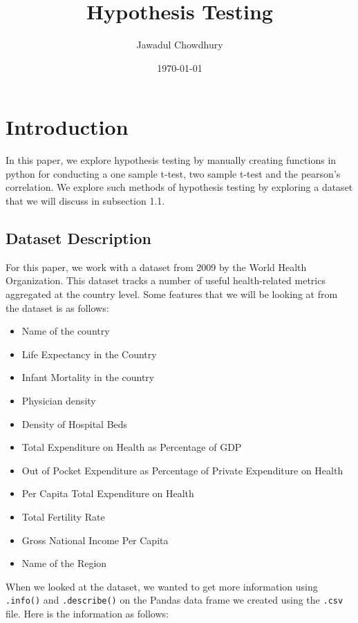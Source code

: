 \documentclass[a4paper, twocolumn]{article}
\title{Hypothesis Testing}
\author{Jawadul Chowdhury}
\date{\today}
\begin{document}
\setlength{\intextsep}{0pt} 
\setlength{\textfloatsep}{5pt} 

\maketitle
\onecolumn
\tableofcontents
\newpage
\twocolumn


\section{Introduction}
In this paper, we explore hypothesis testing by manually creating functions in python for conducting a one sample
t-test, two sample t-test and the pearson's correlation. We explore such methods of hypothesis testing by exploring
a dataset that we will discuss in subsection 1.1.

\subsection{Dataset Description}
For this paper, we work with a dataset from 2009 by the World Health Organization. This dataset tracks a number of 
useful health-related metrics aggregated at the country level. Some features that we will be looking at from the 
dataset is as follows:

\begin{itemize}
    \item Name of the country
    \item Life Expectancy in the Country
    \item Infant Mortality in the country
    \item Physician density
    \item Density of Hospital Beds 
    \item Total Expenditure on Health as Percentage of GDP
    \item Out of Pocket Expenditure as Percentage of Private Expenditure on Health
    \item Per Capita Total Expenditure on Health
    \item Total Fertility Rate 
    \item Gross National Income Per Capita
    \item Name of the Region
\end{itemize}


When we looked at the dataset, we wanted to get more information using \texttt{.info()} and \texttt{.describe()} on
the Pandas data frame we created using the \texttt{.csv} file. Here is the information as follows:
\end{document}

